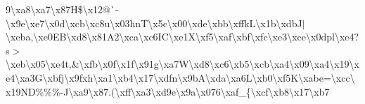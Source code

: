 9\textbackslash{}xa8\textbackslash{}xa7\textbackslash{}x87\+H\$\textbackslash{}x12@\`{}-\/\textbackslash{}x9e\textbackslash{}xe7\textbackslash{}x0d\textbackslash{}xcb\textbackslash{}xc8u\textbackslash{}x03hn\+T\textbackslash{}x5c\textbackslash{}x00\textbackslash{}xde\textbackslash{}xbb\textbackslash{}xffk\+L\textbackslash{}x1b\textbackslash{}xdb\+J$\vert$\textbackslash{}xeba,\textbackslash{}xe0\+E\+B\textbackslash{}xd8\textbackslash{}x81\+A2\textbackslash{}xca\textbackslash{}xc6\+I\+C\textbackslash{}xe1\+X\textbackslash{}xf5\textbackslash{}xaf\textbackslash{}xbf\textbackslash{}xfc\textbackslash{}xe3\textbackslash{}xce\textbackslash{}x0dpl\textbackslash{}xe4?s$>$\textbackslash{}xeb\textbackslash{}x05\textbackslash{}xe4t,\&\textbackslash{}xfb\textbackslash{}x0f\textbackslash{}x1f\textbackslash{}x91g\textbackslash{}xa7\+W\textbackslash{}xd8\textbackslash{}xc6\textbackslash{}xb5\textbackslash{}xcb\textbackslash{}xa4\textbackslash{}x09\textbackslash{}xa4\textbackslash{}x19\textbackslash{}xe4\textbackslash{}xa3\+G\textbackslash{}xbfj\textbackslash{}x9fxh\textbackslash{}xa1\textbackslash{}xb4\textbackslash{}x17\textbackslash{}xdfn\textbackslash{}x9b\+A\textbackslash{}xda\textbackslash{}xa6\+L\textbackslash{}xb0\textbackslash{}xf5\+K\textbackslash{}xabe=\textbackslash{}xcc\textbackslash{}x19\+N\+D\%\%\%-\/\+J\textbackslash{}xa9\textquotesingle{}\textbackslash{}x87.(\textbackslash{}xff\textbackslash{}xa3\textbackslash{}xd9e\textbackslash{}x9a\textbackslash{}x076\textbackslash{}xaf\+\_\+\{\textbackslash{}xcf\textbackslash{}xb8\textbackslash{}x17\textbackslash{}xb7 